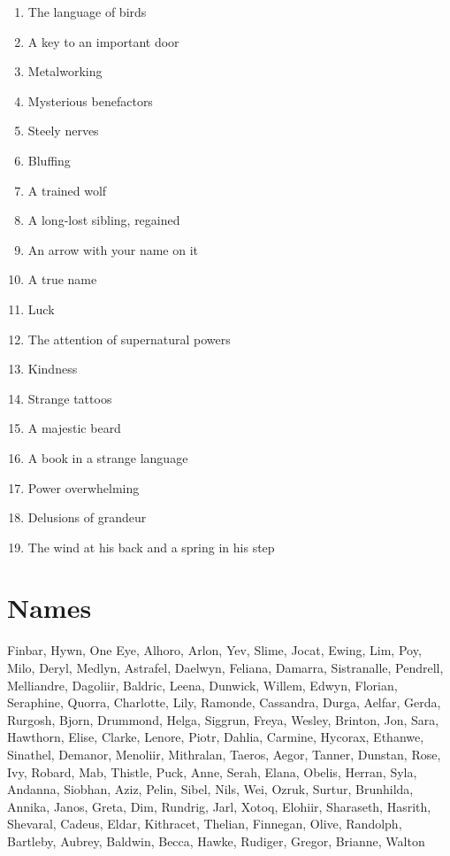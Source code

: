\begin{enumerate}
\item The language of birds
\item A key to an important door
\item Metalworking
\item Mysterious benefactors
\item Steely nerves
\item Bluffing
\item A trained wolf
\item A long-lost sibling, regained
\item An arrow with your name on it
\item A true name
\item Luck
\item The attention of supernatural powers
\item Kindness
\item Strange tattoos
\item A majestic beard
\item A book in a strange language
\item Power overwhelming
\item Delusions of grandeur
\item The wind at his back and a spring in his step

\end{enumerate}
\section{Names}


 Finbar, Hywn, One Eye, Alhoro, Arlon, Yev, Slime, Jocat, Ewing, Lim, Poy, Milo, Deryl, Medlyn, Astrafel, Daelwyn, Feliana, Damarra, Sistranalle, Pendrell, Melliandre, Dagoliir, Baldric, Leena, Dunwick, Willem, Edwyn, Florian, Seraphine, Quorra, Charlotte, Lily, Ramonde, Cassandra, Durga, Aelfar, Gerda, Rurgosh, Bjorn, Drummond, Helga, Siggrun, Freya, Wesley, Brinton, Jon, Sara, Hawthorn, Elise, Clarke, Lenore, Piotr, Dahlia, Carmine, Hycorax, Ethanwe, Sinathel, Demanor, Menoliir, Mithralan, Taeros, Aegor, Tanner, Dunstan, Rose, Ivy, Robard, Mab, Thistle, Puck, Anne, Serah, Elana, Obelis, Herran, Syla, Andanna, Siobhan, Aziz, Pelin, Sibel, Nils, Wei, Ozruk, Surtur, Brunhilda, Annika, Janos, Greta, Dim, Rundrig, Jarl, Xotoq, Elohiir, Sharaseth, Hasrith, Shevaral, Cadeus, Eldar, Kithracet, Thelian, Finnegan, Olive, Randolph, Bartleby, Aubrey, Baldwin, Becca, Hawke, Rudiger, Gregor, Brianne, Walton


